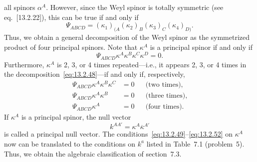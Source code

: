 all spinors \(\alpha^A\). However, since the Weyl spinor is totally symmetric (see
eq.~[13.2.22]), this can be true if and only if
\begin{equation}
  \Psi_{ABCD}
  =(\kappa_1)_{(A}(\kappa_2)_B(\kappa_3)_C(\kappa_4)_{D)}.
  \tag{13.2.48}\label{eq:13.2.48}
\end{equation}
Thus, we obtain a general decomposition of the Weyl spinor as the symmetrized
product of four principal spinors. Note that \(\kappa^A\) is a principal spinor if
and only if
\begin{equation}
  \Psi_{ABCD}\kappa^A\kappa^B\kappa^C\kappa^D=0.
  \tag{13.2.49}\label{eq:13.2.49}
\end{equation}
Furthermore, \(\kappa^A\) is 2, 3, or 4 times repeated---i.e., it appears 2, 3, or
4 times in the decomposition~\eqref{eq:13.2.48}---if and only if, respectively,
\begin{align}
  \Psi_{ABCD}\kappa^A\kappa^B\kappa^C&=0
  &&\text{(two times)}, \tag{13.2.50}\label{eq:13.2.50}\\
  \Psi_{ABCD}\kappa^A\kappa^B&=0
  &&\text{(three times)}, \tag{13.2.51}\label{eq:13.2.51}\\
  \Psi_{ABCD}\kappa^A&=0
  &&\text{(four times)}. \tag{13.2.52}\label{eq:13.2.52}
\end{align}
If \(\kappa^A\) is a principal spinor, the null vector
\begin{equation}
  k^{AA'}=\kappa^A\overline\kappa^{A'}
  \tag{13.2.53}\label{eq:13.2.53}
\end{equation}
is called a principal null vector. The conditions~\eqref{eq:13.2.49}--\eqref{eq:13.2.52}
on \(\kappa^A\) now can be translated to the conditions on \(k^a\) listed in
Table~7.1 (problem~5). Thus, we obtain the algebraic classification of
section~7.3.

